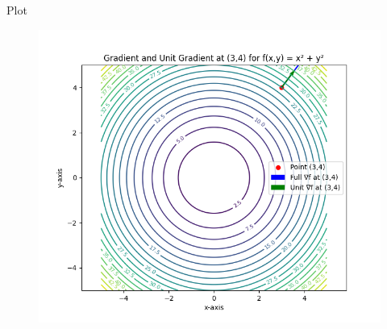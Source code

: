 \documentclass{beamer}
\begin{document}
\begin{frame}{Plot}
    \begin{figure}[H]
    \centering
    \includegraphics[width=0.8\columnwidth]{figs/Figure_1.png}
    \label{fig:1}
\end{figure}
\end{frame}
\end{document}
